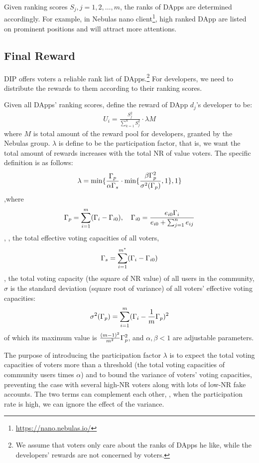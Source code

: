 Given ranking scores $S_j,j=1,2,\ldots,m$, the ranks of DApps are determined accordingly. For example, in Nebulas nano client\footnote{\url{https://nano.nebulas.io/}}, high ranked DApp are listed on prominent positions and will attract more attentions.

\subsection{Final Reward}
DIP offers voters a reliable rank list of DApps.\footnote{We assume that voters only care about the ranks of DApps he like, while the developers' rewards are not concerned by voters.} For developers, we need to distribute the rewards to them according to their ranking scores.

Given all DApps' ranking scores, define the reward of DApp $d_j$'s developer to be:
\begin{align}
	\label{eq:distribution}
	U_i = \frac{S_j^2}{\sum_{k=1}^n S_j^2}\cdot \lambda M
\end{align}
where $M$ is  total amount of the reward pool for developers, granted by the Nebulas group. $\lambda $ is define to be the participation factor, that is, we want the total amount of rewards increases with the total NR of value voters. The specific definition is as follows:
\begin{align}
	\lambda=\min\{\frac{\Gamma_p}{\alpha \Gamma_s }\cdot \min\{\frac{\beta\Gamma_p^2 }{\sigma^2(\Gamma_p)},1\},1\}
\end{align}
,where $$\Gamma_p = \sum_{i=1}^m (\Gamma_i-\Gamma_{i0}),\quad \Gamma_{i0} = \frac{e_{i0}\Gamma_i}{e_{i0}+\sum_{j=1}^n {e_{ij}}}$$, \ie, the total effective voting capacities of all voters,
$$\Gamma_s = \sum_{i=1}^{m^*} (\Gamma_i-\Gamma_{i0})$$,
the total voting capacity (the square of NR value) of all users in the community, $\sigma$ is the standard deviation (square root of variance) of all voters' effective voting capacities:
$$ \sigma^2(\Gamma_p) = \sum_{i=1}^m (\Gamma_i-\frac{1}{m}\Gamma_p)^2 $$
of which its maximum value is $\frac{(m-1)^2}{m^2}\Gamma_p^2$, and $\alpha,\beta < 1$ are adjustable parameters.

The purpose of introducing the participation factor $\lambda$ is to expect the total voting capacities of voters more than a threshold (the total voting capacities of  community users times $\alpha$)  and to bound the variance of voters’ voting capacities, preventing the case with several high-NR voters along with lots of low-NR fake accounts. The two terms can complement each other, \ie, when the participation rate is high, we can ignore the effect of the variance.
